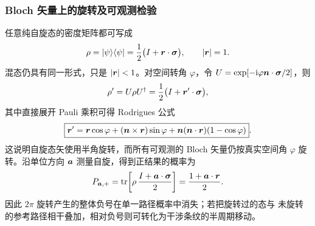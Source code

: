 \subsubsection*{Bloch 矢量上的旋转及可观测检验}
任意纯自旋态的密度矩阵都可写成
\[
 \rho=|\psi\rangle\langle\psi|
 =\frac12\bigl(I+\bm{r}\cdot\bm{\sigma}\bigr),
 \qquad |\bm{r}|=1.
\]
混态仍具有同一形式，只是 $|\bm{r}|<1$。对空间转角 $\varphi$，令
$U=\exp[-\mathrm i\varphi\bm{n}\cdot\bm{\sigma}/2]$，则
\[
 \rho'=U\rho U^\dagger
 =\frac12\bigl(I+\bm{r}'\cdot\bm{\sigma}\bigr),
\]
其中直接展开 Pauli 乘积可得 Rodrigues 公式
\[
 \boxed{\bm{r}'
 =\bm{r}\cos\varphi
 +(\bm{n}\times\bm{r})\sin\varphi
 +\bm{n}(\bm{n}\cdot\bm{r})(1-\cos\varphi)}.
\]
这说明自旋态矢使用半角旋转，而所有可观测的 Bloch 矢量仍按真实空间角
$\varphi$ 旋转。沿单位方向 $\bm{a}$ 测量自旋，得到正结果的概率为
\[
 P_{\bm{a},+}
 =\operatorname{tr}\!\left[
 \rho\,\frac{I+\bm{a}\cdot\bm{\sigma}}{2}\right]
 =\frac{1+\bm{a}\cdot\bm{r}}{2}.
\]
因此 $2\pi$ 旋转产生的整体负号在单一路径概率中消失；若把旋转过的态与
未旋转的参考路径相干叠加，相对负号则可转化为干涉条纹的半周期移动。
